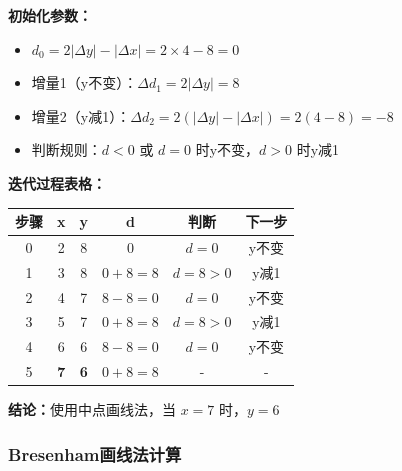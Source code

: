 \documentclass[12pt,a4paper]{article}
\begin{document}
\begin{tcolorbox}
\textbf{初始化参数：}
\begin{itemize}
    \item $d_0 = 2|\Delta y| - |\Delta x| = 2 \times 4 - 8 = 0$
    \item 增量1（y不变）：$\Delta d_1 = 2|\Delta y| = 8$
    \item 增量2（y减1）：$\Delta d_2 = 2(|\Delta y| - |\Delta x|) = 2(4-8) = -8$
    \item 判断规则：$d < 0$ 或 $d = 0$ 时y不变，$d > 0$ 时y减1
\end{itemize}

\textbf{迭代过程表格：}

\begin{center}
\begin{tabular}{|c|c|c|c|c|c|}
\hline
\textbf{步骤} & \textbf{x} & \textbf{y} & \textbf{d} & \textbf{判断} & \textbf{下一步} \\
\hline
0 & 2 & 8 & 0 & $d=0$ & y不变 \\
\hline
1 & 3 & 8 & $0+8=8$ & $d=8>0$ & y减1 \\
\hline
2 & 4 & 7 & $8-8=0$ & $d=0$ & y不变 \\
\hline
3 & 5 & 7 & $0+8=8$ & $d=8>0$ & y减1 \\
\hline
4 & 6 & 6 & $8-8=0$ & $d=0$ & y不变 \\
\hline
5 & \textbf{7} & \textbf{6} & $0+8=8$ & - & - \\
\hline
\end{tabular}
\end{center}

\textbf{结论：}使用中点画线法，当 $x = 7$ 时，$\boxed{y = 6}$
\end{tcolorbox}

\subsubsection{Bresenham画线法计算}
\end{document}
